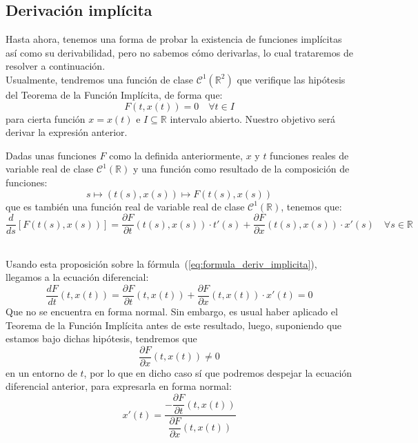 \subsection{Derivación implícita}
Hasta ahora, tenemos una forma de probar la existencia de funciones implícitas así como su derivabilidad, pero no sabemos cómo derivarlas, lo cual trataremos de resolver a continuación.\\

\noindent
Usualmente, tendremos una función
de clase $\mathcal{C}^1(\mathbb{R}^2)$ que verifique las hipótesis del Teorema de la Función Implícita, de forma que:
\begin{equation}\label{eq:formula_deriv_implicita}
    F(t,x(t)) = 0 \quad \forall t\in I
\end{equation}
para cierta función $x=x(t)$ e $I\subseteq \mathbb{R}$ intervalo abierto. Nuestro objetivo será derivar la expresión anterior.

\begin{prop}
    Dadas unas funciones $F$ como la definida anteriormente, $x$ y $t$ funciones reales de variable real de clase $\mathcal{C}^1(\mathbb{R})$ y una función como resultado de la composición de funciones:
    \begin{equation*}
        s \longmapsto (t(s), x(s)) \longmapsto F(t(s), x(s))
    \end{equation*}
    que es también una función real de variable real de clase $\mathcal{C}^1(\mathbb{R})$, tenemos que:
    \begin{equation*}
        \dfrac{d}{ds}[ F(t(s),x(s))] = \dfrac{\partial F}{\partial t}(t(s), x(s))\cdot t'(s) + \dfrac{\partial F}{\partial x}(t(s),x(s))\cdot x'(s) \quad \forall s\in \mathbb{R}
    \end{equation*}
\end{prop}~\\

\noindent
Usando esta proposición sobre la fórmula~(\ref{eq:formula_deriv_implicita}), llegamos a la ecuación diferencial:
\begin{equation*}
    \dfrac{dF}{dt}(t,x(t)) = \dfrac{\partial F}{\partial t}(t,x(t)) + \dfrac{\partial F}{\partial x}(t,x(t))\cdot x'(t) = 0
\end{equation*}
Que no se encuentra en forma normal. Sin embargo, es usual haber aplicado el Teorema de la Función Implícita antes de este resultado, luego, suponiendo que estamos bajo dichas hipótesis, tendremos que 
\begin{equation*}
    \dfrac{\partial F}{\partial x}(t,x(t)) \neq 0
\end{equation*}
en un entorno de $t$, por lo que en dicho caso sí que podremos despejar la ecuación diferencial anterior, para expresarla en forma normal:
\begin{equation*}
    x'(t) = \dfrac{-\dfrac{\partial F}{\partial t}(t,x(t))}{\dfrac{\partial F}{\partial x}(t,x(t))}
\end{equation*}



